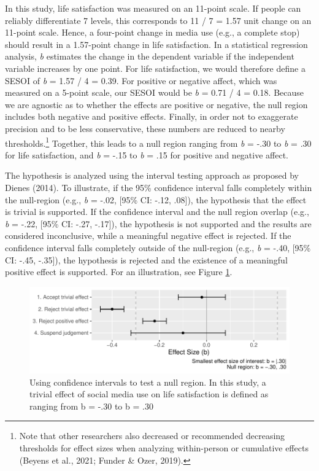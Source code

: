 \documentclass[
  man,floatsintext]{apa7}
\begin{document}
In this study, life satisfaction was measured on an 11-point scale.
If people can reliably differentiate 7 levels, this corresponds to 11 / 7 = 1.57 unit change on an 11-point scale.
Hence, a four-point change in media use (e.g., a complete stop) should result in a 1.57-point change in life satisfaction.
In a statistical regression analysis, \emph{b} estimates the change in the dependent variable if the independent variable increases by one point.
For life satisfaction, we would therefore define a SESOI of \emph{b} = 1.57 / 4 = 0.39.
For positive or negative affect, which was measured on a 5-point scale, our SESOI would be \emph{b} = 0.71 / 4 = 0.18.
Because we are agnostic as to whether the effects are positive or negative, the null region includes both negative and positive effects.
Finally, in order not to exaggerate precision and to be less conservative, these numbers are reduced to nearby thresholds.\footnote{Note that other researchers also decreased or recommended decreasing thresholds for effect sizes when analyzing within-person or cumulative effects (Beyens et al., 2021; Funder \& Ozer, 2019).}
Together, this leads to a null region ranging from \emph{b} = -.30 to \emph{b} = .30 for life satisfaction, and \emph{b} = -.15 to \emph{b} = .15 for positive and negative affect.

The hypothesis is analyzed using the interval testing approach as proposed by Dienes (2014).
To illustrate, if the 95\% confidence interval falls completely within the null-region (e.g., \emph{b} = -.02, {[}95\% CI: -.12, .08{]}), the hypothesis that the effect is trivial is supported.
If the confidence interval and the null region overlap (e.g., \emph{b} = -.22, {[}95\% CI: -.27, -.17{]}), the hypothesis is not supported and the results are considered inconclusive, while a meaningful negative effect is rejected.
If the confidence interval falls completely outside of the null-region (e.g., \emph{b} = -.40, {[}95\% CI: -.45, -.35{]}), the hypothesis is rejected and the existence of a meaningful positive effect is supported.
For an illustration, see Figure \ref{fig:sesoi}.

\begin{figure}
\centering
\includegraphics{manuscript_files/figure-latex/sesoi-1.pdf}
\caption{\label{fig:sesoi}Using confidence intervals to test a null region. In this study, a trivial effect of social media use on life satisfaction is defined as ranging from b = -.30 to b = .30}
\end{figure}
\end{document}

